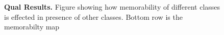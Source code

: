 \begin{figure}[b]
\vspace{-5mm}\caption{\footnotesize\textbf{Qual Results.} Figure showing how memorability of different classes is effected in presence of other classes. Bottom row is the memorabilty map}\label{fig:qualInterClass}
\end{figure}


